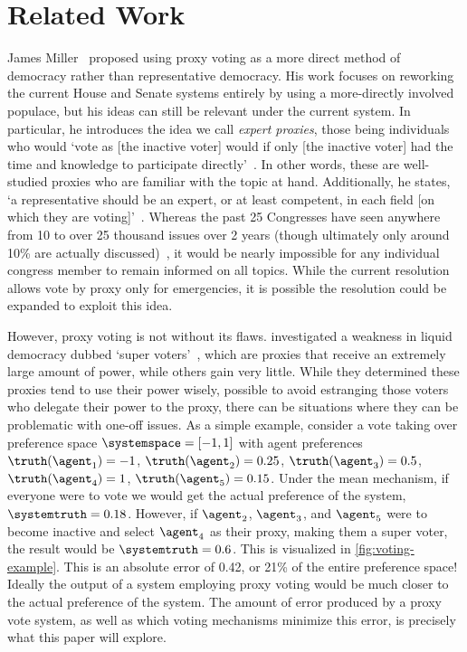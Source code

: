 \section{Related Work}\label{sec:related-work}
James Miller~\cite{Miller1969} proposed using proxy voting as a more direct method of
democracy rather than representative democracy.
His work focuses on reworking the current House and Senate systems entirely by using a
more-directly involved populace, but his ideas can still be relevant under the current
system.
In particular, he introduces the idea we call \textit{expert proxies},
those being individuals who would `vote as [the inactive voter] would if only
[the inactive voter] had the time and knowledge to participate
directly'~\cite{Miller1969}.
In other words, these are well-studied proxies who are familiar with the topic at hand.
Additionally, he states, `a representative should be an expert, or at least
competent, in each field [on which they are voting]'~\cite{Miller1969}.
Whereas the past 25 Congresses have seen anywhere from 10 to over 25 thousand issues
over 2 years (though ultimately only around 10\% are actually
discussed)~\cite{GovTrack2022}, it would be nearly impossible for any individual
congress member to remain informed on all topics.
While the current resolution allows vote by proxy only for emergencies, it is
possible the resolution could be expanded to exploit this idea.


However, proxy voting is not without its flaws.
 investigated a weakness in liquid democracy dubbed
`super voters'~\cite{Kling2015}, which are proxies that receive an extremely large
amount of power, while others gain very little.
While they determined these proxies tend to use their power wisely, possible to avoid
estranging those voters who delegate their power to the proxy, there can be
situations where they can be problematic with one-off issues.
As a simple example, consider a vote taking over preference
space $\systemspace = [-1, 1]$ with agent preferences $\truthof{\agent_1} = -1$,
$\truthof{\agent_2} = 0.25$, $\truthof{\agent_3} = 0.5$, $\truthof{\agent_4} = 1$,
$\truthof{\agent_5} = 0.15$.
Under the mean mechanism, if everyone were to vote
we would get the actual preference of the system, $\systemtruth = 0.18$.
However, if $\agent_2$, $\agent_3$, and $\agent_5$ were to become inactive and select
$\agent_4$ as their proxy, making them a super voter, the result would be
$\systemtruth = 0.6$.
This is visualized in \autoref{fig:voting-example}.
This is an absolute error of 0.42, or 21\% of the entire preference space!
Ideally the output of a system employing proxy voting would be much closer to the
actual preference of the system.
The amount of error produced by a proxy vote system, as well as which voting
mechanisms minimize this error, is precisely what this paper will explore.

